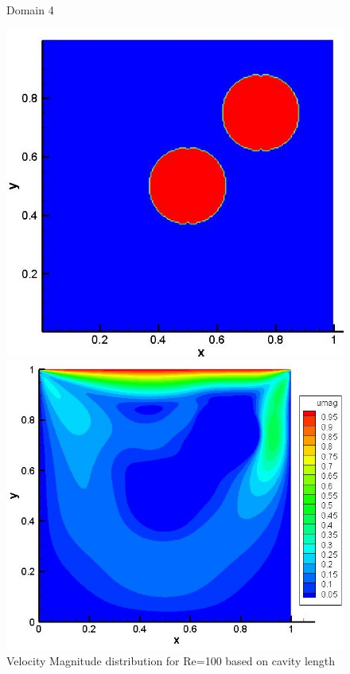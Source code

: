 \documentclass[12pt]{elsarticle}
\begin{document}
	\begin{figure}[h]
		\caption{Domain 4}
		\centering\includegraphics[width=0.7\linewidth]{58_immerssed_boundary_domain}
		\caption{Velocity Magnitude distribution for Re=100 based on cavity length}
		\centering\includegraphics[width=0.7\linewidth]{58_immerssed_boundary_umag}
	\end{figure}
	
\end{document}
